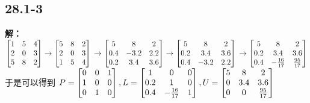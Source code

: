 \documentclass[twocolumn]{article}
\newenvironment{SChinese}{%
	\CJKfamily{gbsn}%
	\CJKtilde
	\CJKnospace}{}
\begin{document}
\begin{CJK}{UTF8}{}
\begin{SChinese}
			\section*{28.1-3}
			\textbf{解：}
			$\left [\begin{matrix}
			1 & 5 & 4 \\
			2 & 0 & 3 \\
			5 & 8 & 2  
			\end{matrix}\right] \rightarrow \left [\begin{matrix}
			5 & 8 & 2 \\
			2 & 0 & 3 \\
			1 & 5 & 4  
			\end{matrix}\right] \newline \rightarrow \left [\begin{matrix}
			5 & 8 & 2 \\
			0.4 & -3.2 & 2.2 \\
			0.2 & 3.4 & 3.6  
			\end{matrix}\right] \rightarrow \left [\begin{matrix}
			5 & 8 & 2 \\
			0.2 & 3.4 & 3.6 \\
			0.4 & -3.2 & 2.2  
			\end{matrix}\right] \newline \rightarrow \left [\begin{matrix}
			5 & 8 & 2 \\
			0.2 & 3.4 & 3.6 \\
			0.4 & -\frac{16}{17} & \frac{95}{17}  
			\end{matrix}\right]$\\
			于是可以得到	$P = \left [\begin{matrix}
			0 & 0 & 1 \\
			1 & 0 & 0 \\
			0 & 1 & 0  
			\end{matrix}\right],\newline L = \left [\begin{matrix}
			1 & 0 & 0 \\
			0.2 & 1 & 0 \\
			0.4 & -\frac{16}{17} & 1  
			\end{matrix}\right],
			U = \left [\begin{matrix}
			5 & 8 & 2 \\
			0 & 3.4 & 3.6 \\
			0 & 0 & \frac{95}{17}  
			\end{matrix}\right]$\\

\end{SChinese}
\end{CJK}
\end{document}
